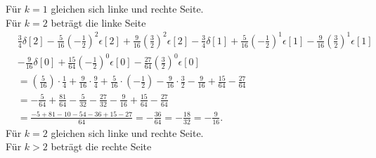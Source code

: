 \documentclass[11pt,a4paper,DIV=12]{scrartcl}
\begin{document}
%
%
Für $k=1$ gleichen sich linke und rechte Seite.\\
%
Für $k=2$ beträgt die linke Seite
%
%
%
\begin{align}
	&\frac{3}{4}\delta[2]-\frac{5}{16}\left(-\frac{1}{2}\right)^2\epsilon[2]+\frac{9}{16}\left(\frac{3}{2}\right)^2\epsilon[2]-\frac{3}{4}\delta[1]+\frac{5}{16}\left(-\frac{1}{2}\right)^{1}\epsilon[1]-\frac{9}{16}\left(\frac{3}{2}\right)^{1}\epsilon[1]\nonumber \\
	&-\frac{9}{16}\delta[0]+\frac{15}{64}\left(-\frac{1}{2}\right)^{0}\epsilon[0]-\frac{27}{64}\left(\frac{3}{2}\right)^{0}\epsilon[0]\nonumber\\
	&=\left(\frac{5}{16}\right)\cdot\frac{1}{4}+\frac{9}{16}\cdot\frac{9}{4}+\frac{5}{16}\cdot\left(-\frac{1}{2}\right)-\frac{9}{16}\cdot\frac{3}{2}-\frac{9}{16}+\frac{15}{64}-\frac{27}{64}\nonumber\\
	&=-\frac{5}{64}+\frac{81}{64}-\frac{5}{32}-\frac{27}{32}-\frac{9}{16}+\frac{15}{64}-\frac{27}{64}\nonumber\\
	&=\frac{-5+81-10-54-36+15-27}{64}=-\frac{36}{64}=-\frac{18}{32}=-\frac{9}{16}.
\end{align}
%
%
%
Für $k=2$ gleichen sich linke und rechte Seite.\\
%
Für $k>2$ beträgt die rechte Seite
%
%
%
\end{document}
